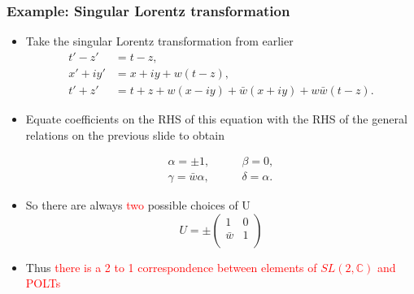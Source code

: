 \documentclass[10pt,a4paper]{beamer}
\begin{document}
\begin{frame}
\end{frame}

\begin{frame}
\frametitle{Example: Singular Lorentz transformation}
\begin{itemize}
\item<1->{Take the singular Lorentz transformation from earlier
\begin{align*}
t'-z' & = t-z, \\
x'+iy' & = x + iy + w(t-z), \\
t'+z' & = t+z + w(x-iy) + \bar{w} (x + iy) + w \bar{w} (t-z).
\end{align*}
}
\item<2->{Equate coefficients on the RHS of this equation with the RHS of the general relations on the previous slide to obtain

\begin{align*}
\alpha = \pm 1, \qquad & \beta = 0, \\
\gamma = \bar{w}\alpha, \qquad &  \delta = \alpha.
\end{align*}
}
\item<3->{So there are always \textcolor{red}{two} possible choices of U
\begin{equation*}
U = \pm
\left(
\begin{array}{cc}
1       & 0 \\
\bar{w} & 1 \\
\end{array}
\right)
\end{equation*}
}
\item<4->{Thus \textcolor{red}{there is a 2 to 1 correspondence between elements of $SL(2,\mathbb{C})$ and POLTs}}
\end{itemize}

\end{frame}
\end{document}
